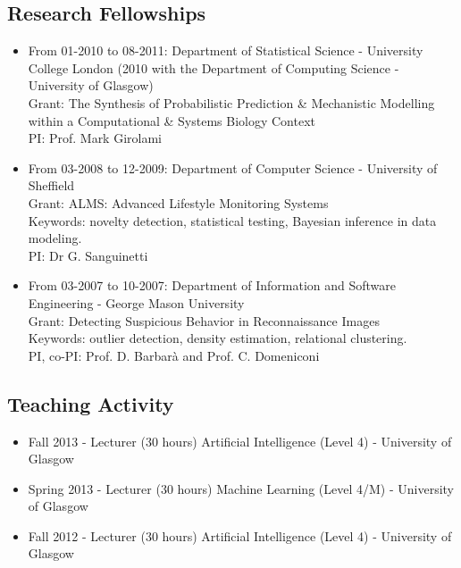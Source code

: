 \documentclass[a4paper,10pt]{article}
\begin{document}
\subsection*{Research Fellowships}
\begin{itemize}
\item From 01-2010 to 08-2011:
  Department of Statistical Science - University College London (2010 with the Department of Computing Science - University of Glasgow) \\
  Grant: The Synthesis of Probabilistic Prediction \& Mechanistic Modelling within a Computational \& Systems Biology Context \\
  PI: Prof. Mark Girolami

\item From 03-2008 to 12-2009: 
  Department of Computer Science - University of Sheffield \\
  Grant: ALMS: Advanced Lifestyle Monitoring Systems \\
  Keywords: novelty detection, statistical testing, Bayesian inference in data modeling. \\
  PI: Dr G. Sanguinetti

\item From 03-2007 to 10-2007: 
  Department of Information and Software Engineering - George Mason University \\
  Grant: Detecting Suspicious Behavior in Reconnaissance Images \\
  Keywords: outlier detection, density estimation, relational clustering. \\
  PI, co-PI: Prof. D. Barbar\`a and Prof. C. Domeniconi
\end{itemize}


\subsection*{Teaching Activity}
\begin{itemize}
\item Fall 2013 - Lecturer (30 hours) 
  Artificial Intelligence (Level 4) - University of Glasgow
\item Spring 2013 - Lecturer (30 hours) 
  Machine Learning (Level 4/M) - University of Glasgow
\item Fall 2012 - Lecturer (30 hours) 
  Artificial Intelligence (Level 4) - University of Glasgow
\end{itemize}
\end{document}
